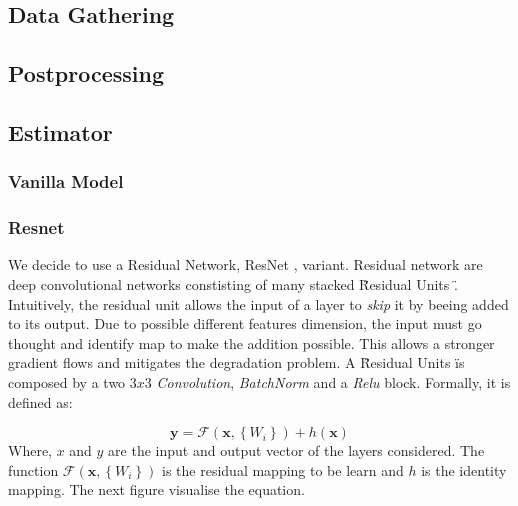 \documentclass[../document.tex]{subfiles}
\begin{document}
\subsection{Data Gathering}
\subsection{Postprocessing}
\subsection{Estimator}

\subsubsection{Vanilla Model}
\subsubsection{Resnet}

We decide to use a Residual Network, ResNet \cite{he2015deep}, variant. Residual network are deep convolutional
networks constisting of many stacked \"Residual Units \". Intuitively, the residual unit allows the input of a layer to \emph{skip} it by beeing added to its output. Due to possible different features dimension, the input must go thought and identify map to make the addition possible. This allows a stronger gradient flows and mitigates the degradation problem. A \"Residual Units \" is composed by a two $3x3$ \emph{Convolution}, \emph{BatchNorm} \cite{ioffe2015batch} and a \emph{Relu} block. Formally, it is defined as: 

\begin{equation}
	\mathbf{y}=\mathcal{F}\left(\mathbf{x},\left\{W_{i}\right\}\right)+h(\mathbf{x})
	\label{eq : resnet}
\end{equation}
Where, $x$ and $y$ are the input and output vector of the layers considered. The function $\mathcal{F}\left(\mathbf{x},\left\{W_{i}\right\}\right)$ is the residual mapping to be learn and $h$ is the identity mapping. The next figure visualise the equation.
\end{document}
